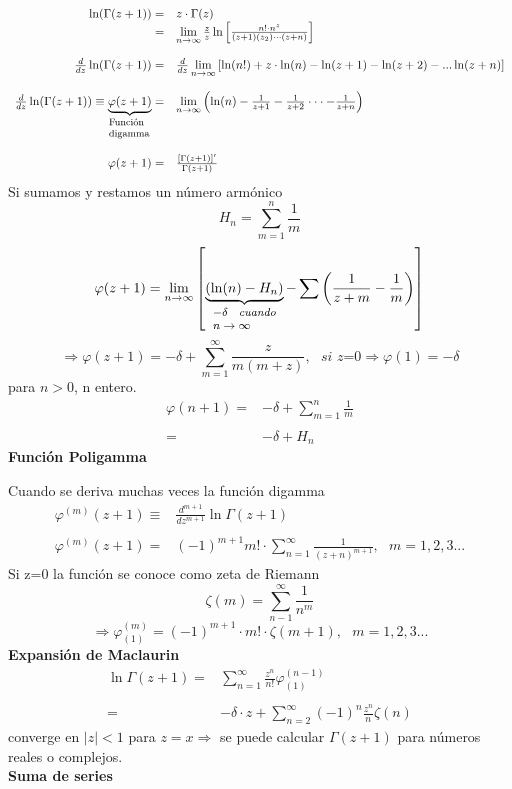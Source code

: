 \documentclass{article}
\theoremstyle{definition}
\begin{document}
\[
\begin{array}{rl}
	\ln(\Gamma (z+1))=& z\cdot\Gamma (z)\\
	=& \lim\limits_{n\to \infty}\frac{z}{z} \ln\left[\frac{n!\cdot n^z}{(z+1)(z_2)\cdot\cdot\cdot (z+n)}\right]\\
	\\
	\frac{d}{dz} \ln(\Gamma (z+1))=& \frac{d}{dz}\lim\limits_{n\to \infty}\left[\ln(n!)+z\cdot \ln(n)-\ln(z+1)-\ln(z+2)-...\ln(z+n)\right]\\
	\\
	\frac{d}{dz}\ln (\Gamma (z+1))\equiv \underbrace{\varphi (z+1)}_{\parbox{3.5em}{\footnotesize Función digamma}}=& \lim\limits_{n\to \infty}\left( \ln (n)-\frac{1}{z+1}-\frac{1}{z+2}\cdot\cdot\cdot -\frac{1}{z+n}\right)\\
	\\
	\varphi (z+1)=& \frac{[\Gamma (z+1)]'}{\Gamma (z+1)}
\end{array}
\]
Si sumamos y restamos un número armónico
\[H_n=\sum^n_{m=1}\frac{1}{m}\]
\[\varphi (z+1) =\lim\limits_{n\to \infty} \left[\underbrace{(\ln (n)-H_n)}_{\parbox{4.5em}{\footnotesize $-\delta$\textit{ cuando } $n\to\infty$}}-\sum\left(\frac{1}{z+m}-\frac{1}{m}\right)\right]\]
\[\Rightarrow \varphi (z+1) = -\delta +\sum^{\infty}_{m=1}\frac{z}{m(m+z)},\ \ \ \textit{si z=0}\Rightarrow\varphi (1)=-\delta\]
para $n>0$, n entero.
\[
\begin{array}{rl}
	\varphi (n+1) =& -\delta +\sum\limits^{n}_{m=1}\frac{1}{m}\\
	\\
	=& -\delta+H_n
\end{array}
\]
\textbf{Función Poligamma}

Cuando se deriva muchas veces la función digamma
\[
\begin{array}{rl}
	\varphi^{(m)} (z+1) \equiv& \frac{d^{m+1}}{dz^{m+1}}\ln\Gamma (z+1)\\
	\\
	\varphi^{(m)} (z+1)=& (-1)^{m+1}m!\cdot \sum\limits^{\infty}_{n=1}\frac{1}{(z+n)^{m+1}},\ \ \ m=1,2,3...
\end{array}
\]
Si z=0 la función se conoce como zeta de Riemann
\[\zeta (m) = \sum^{\infty}_{n-1}\frac{1}{n^m}\]
\[\Rightarrow \varphi^{(m)}_{(1)}=(-1)^{m+1}\cdot m!\cdot \zeta (m+1),\ \ \ m=1,2,3...\]
\textbf{Expansión de Maclaurin}
\[
\begin{array}{rl}
	\ln\Gamma (z+1) =& \sum^{\infty}_{n=1}\frac{z^n}{n!}\varphi^{(n-1)}_{(1)}\\
	\\
	=& -\delta\cdot z +\sum^{\infty}_{n=2}(-1)^n\frac{z^n}{n}\zeta (n)
\end{array}
\]
converge en $|z|<1$ para $z=x\Rightarrow$ se puede calcular $\Gamma (z+1)$ para números reales o complejos.\\
\textbf{Suma de series}
\end{document}
